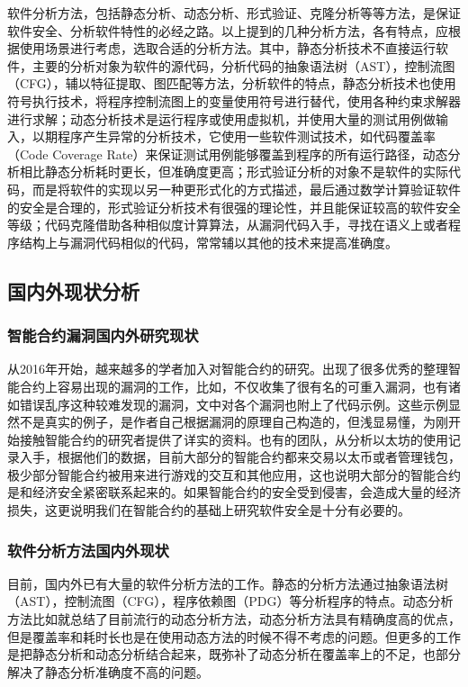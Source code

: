 软件分析方法，包括静态分析、动态分析、形式验证、克隆分析等等方法，是保证软件安全、分析软件特性的必经之路。以上提到的几种分析方法，各有特点，应根据使用场景进行考虑，选取合适的分析方法。其中，静态分析技术不直接运行软件，主要的分析对象为软件的源代码，分析代码的抽象语法树（AST），控制流图（CFG），辅以特征提取\cite{deckard}、图匹配等方法，分析软件的特点，静态分析技术也使用符号执行技术，将程序控制流图上的变量使用符号进行替代，使用各种约束求解器进行求解；动态分析技术是运行程序或使用虚拟机，并使用大量的测试用例做输入，以期程序产生异常的分析技术，它使用一些软件测试技术，如代码覆盖率（Code Coverage Rate）来保证测试用例能够覆盖到程序的所有运行路径，动态分析相比静态分析耗时更长，但准确度更高；形式验证分析的对象不是软件的实际代码，而是将软件的实现以另一种更形式化的方式描述，最后通过数学计算验证软件的安全是合理的，形式验证分析技术有很强的理论性，并且能保证较高的软件安全等级；代码克隆借助各种相似度计算算法，从漏洞代码入手，寻找在语义上或者程序结构上与漏洞代码相似的代码，常常辅以其他的技术来提高准确度。

\subsection{国内外现状分析}

\subsubsection{智能合约漏洞国内外研究现状}

从2016年开始，越来越多的学者加入对智能合约的研究。出现了很多优秀的整理智能合约上容易出现的漏洞的工作，比如\cite{survey-on-attacks}，不仅收集了很有名的可重入漏洞，也有诸如错误乱序这种较难发现的漏洞，文中对各个漏洞也附上了代码示例。这些示例显然不是真实的例子，是作者自己根据漏洞的原理自己构造的，但浅显易懂，为刚开始接触智能合约的研究者提供了详实的资料。也有的团队\cite{survey-on-smart-contracts}，从分析以太坊的使用记录入手，根据他们的数据，目前大部分的智能合约都来交易以太币或者管理钱包，极少部分智能合约被用来进行游戏的交互和其他应用，这也说明大部分的智能合约是和经济安全紧密联系起来的。如果智能合约的安全受到侵害，会造成大量的经济损失，这更说明我们在智能合约的基础上研究软件安全是十分有必要的。

\subsubsection{软件分析方法国内外现状}

目前，国内外已有大量的软件分析方法的工作。静态的分析方法通过抽象语法树（AST），控制流图（CFG），程序依赖图（PDG）等分析程序的特点。动态分析方法比如\cite{survey-dynamic}就总结了目前流行的动态分析方法，动态分析方法具有精确度高的优点，但是覆盖率和耗时长也是在使用动态方法的时候不得不考虑的问题。但更多的工作是把静态分析和动态分析结合起来，既弥补了动态分析在覆盖率上的不足，也部分解决了静态分析准确度不高的问题。

